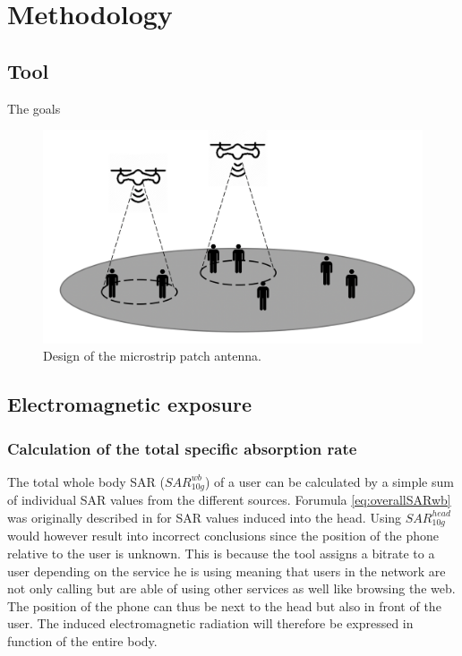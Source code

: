 \chapter{Methodology}
\label{chap:methodology}


\section{Tool}
The goals 
\begin{figure}[h!]
\centering
  \includegraphics[width=\textwidth]{../images/generalIdeaIllustration.png}
  \caption{Design of the microstrip patch antenna.}
  \label{fig:antennadesign}
\end{figure}


\section{Electromagnetic exposure}
\subsection{Calculation of the total specific absorption rate} %
\label{sub:Calculationexposure}

The total whole body \gls{SAR} ($SAR^{wb}_{10g}$) of a user can be calculated by a simple sum of individual SAR values from the different sources.
Forumula \ref{eq:overallSARwb} was originally described in \cite{J17_kuehn2019modelling} for \gls{SAR} values induced into the head.
Using $SAR^{head}_{10g}$ would however result into incorrect conclusions since 
the position of the phone relative to the user is unknown. This is because the tool assigns a bitrate 
to a user depending on the service he is using
meaning that users in the network are not only calling but are able of using other services as well like browsing the web. 
The position of the phone can thus be next to the head but also in front of the user.
The induced electromagnetic radiation will therefore be expressed in function of the entire body.


